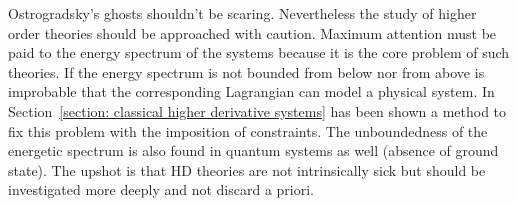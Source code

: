 Ostrogradsky's ghosts shouldn't be scaring. Nevertheless the study of higher
order theories should be approached with caution. Maximum attention must be paid
to the energy spectrum of the systems because it is the core problem of such
theories. If the energy spectrum is not bounded from below nor from above
is improbable that the corresponding Lagrangian can model a physical system.
In Section~\ref{section: classical higher derivative systems} has been shown a
method to fix this problem with the imposition of constraints. The unboundedness
of the energetic spectrum is also found in quantum systems as well (absence of
ground state). The upshot is that HD theories are not intrinsically sick but
should be investigated more deeply and not discard a priori.
